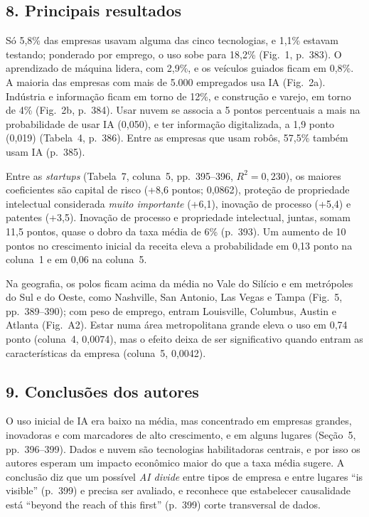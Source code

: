 \subsection*{8. Principais resultados}
Só 5,8\% das empresas usavam alguma das cinco tecnologias, e 1,1\% estavam testando; ponderado por
emprego, o uso sobe para 18,2\% (Fig.~1, p.~383). O aprendizado de máquina lidera, com 2,9\%, e os
veículos guiados ficam em 0,8\%. A maioria das empresas com mais de 5.000 empregados usa IA
(Fig.~2a). Indústria e informação ficam em torno de 12\%, e construção e varejo, em torno de 4\%
(Fig.~2b, p.~384). Usar nuvem se associa a 5 pontos percentuais a mais na probabilidade de usar IA
(0,050), e ter informação digitalizada, a 1,9 ponto (0,019) (Tabela~4, p.~386). Entre as empresas
que usam robôs, 57,5\% também usam IA (p.~385).

Entre as \emph{startups} (Tabela~7, coluna~5, pp.~395--396, $R^2 = 0{,}230$), os maiores
coeficientes são capital de risco (+8,6 pontos; 0,0862), proteção de propriedade intelectual
considerada \emph{muito importante} (+6,1), inovação de processo (+5,4) e patentes (+3,5). Inovação
de processo e propriedade intelectual, juntas, somam 11,5 pontos, quase o dobro da taxa média de 6\%
(p.~393). Um aumento de 10 pontos no crescimento inicial da receita eleva a probabilidade em 0,13
ponto na coluna~1 e em 0,06 na coluna~5.

Na geografia, os polos ficam acima da média no Vale do Silício e em metrópoles do Sul e do Oeste,
como Nashville, San Antonio, Las Vegas e Tampa (Fig.~5, pp.~389--390); com peso de emprego, entram
Louisville, Columbus, Austin e Atlanta (Fig.~A2). Estar numa área metropolitana grande eleva o uso
em 0,74 ponto (coluna~4, 0,0074), mas o efeito deixa de ser significativo quando entram as
características da empresa (coluna~5, 0,0042).

\subsection*{9. Conclusões dos autores}
O uso inicial de IA era baixo na média, mas concentrado em empresas grandes, inovadoras e com
marcadores de alto crescimento, e em alguns lugares (Seção~5, pp.~396--399). Dados e nuvem são
tecnologias habilitadoras centrais, e por isso os autores esperam um impacto econômico maior do que
a taxa média sugere. A conclusão diz que um possível \emph{AI divide} entre tipos de empresa e entre
lugares ``is visible'' (p.~399) e precisa ser avaliado, e reconhece que estabelecer causalidade
está ``beyond the reach of this first'' (p.~399) corte transversal de dados.

